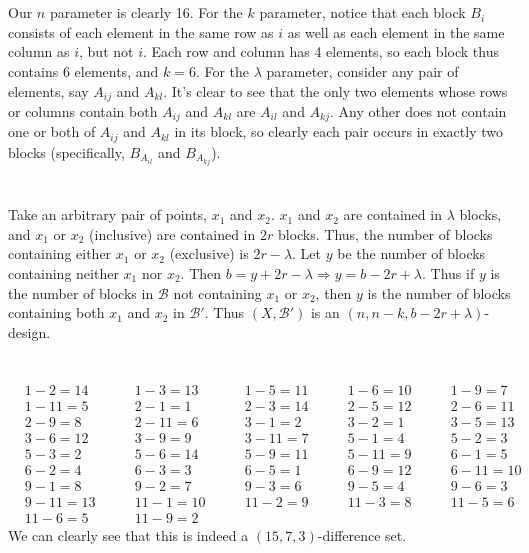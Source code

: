 \documentclass{article}
\begin{document}
\section{} %
Our $n$ parameter is clearly 16.
\newline
For the $k$ parameter, notice that each block
$B_i$ consists of each element in the same row as $i$ as well as each element
in the same column as $i$, but not $i$. Each row and column has 4 elements, so
each block thus contains 6 elements, and $k=6$.
\newline
For the $\lambda$ parameter, consider any pair of elements, say $A_{ij}$ and
$A_{kl}$. It's clear to see that the only two elements whose rows or columns
contain both $A_{ij}$ and $A_{kl}$ are $A_{il}$ and $A_{kj}$. Any other does
not contain one or both of $A_{ij}$ and $A_{kl}$ in its block, so clearly each
pair occurs in exactly two blocks (specifically, $B_{A_{il}}$ and $B_{A_{kj}}$).
\section{} %
Take an arbitrary pair of points, $x_1$ and $x_2$. $x_1$ and $x_2$ are contained
in $\lambda$ blocks, and $x_1$ or $x_2$ (inclusive) are contained in $2r$ blocks.
Thus, the number of blocks containing either $x_1$ or $x_2$ (exclusive) is
$2r-\lambda$. Let $y$ be the number of blocks containing neither $x_1$ nor $x_2$.
Then $b=y+2r-\lambda\Rightarrow y=b-2r+\lambda$. Thus if $y$ is the number of
blocks in $\mathcal{B}$ not containing $x_1$ or $x_2$, then $y$ is the number
of blocks containing both $x_1$ and $x_2$ in $\mathcal{B}'$. Thus
$(X,\mathcal{B}')$ is an $(n,n-k,b-2r+\lambda)$-design.
\section{} %
\subsection{} %
\begin{align*}
&1-2=14\qquad&1-3=13\qquad&1-5=11\qquad&1-6=10\qquad&1-9=7\qquad\\
&1-11=5\qquad&2-1=1\qquad&2-3=14\qquad&2-5=12\qquad&2-6=11\qquad\\
&2-9=8\qquad&2-11=6\qquad&3-1=2\qquad&3-2=1\qquad&3-5=13\qquad\\
&3-6=12\qquad&3-9=9\qquad&3-11=7\qquad&5-1=4\qquad&5-2=3\qquad\\
&5-3=2\qquad&5-6=14\qquad&5-9=11\qquad&5-11=9\qquad&6-1=5\qquad\\
&6-2=4\qquad&6-3=3\qquad&6-5=1\qquad&6-9=12\qquad&6-11=10\qquad\\
&9-1=8\qquad&9-2=7\qquad&9-3=6\qquad&9-5=4\qquad&9-6=3\qquad\\
&9-11=13\qquad&11-1=10\qquad&11-2=9\qquad&11-3=8\qquad&11-5=6\qquad\\
&11-6=5\qquad&11-9=2
\end{align*}
We can clearly see that this is indeed a $(15,7,3)$-difference set.
\end{document}
